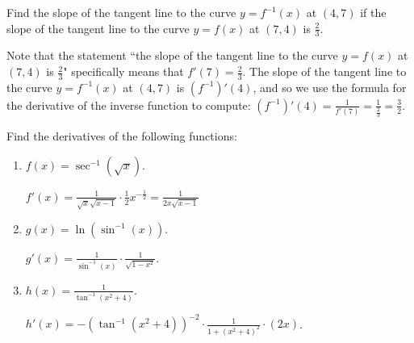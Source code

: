 \documentclass[nooutcomes,handout]{ximera}
\begin{document}
\begin{problem}

  Find the slope of the tangent line to the curve $y = f^{-1}(x)$ at $(4,7)$ if the slope of the tangent line to the curve $y=f(x)$ at $(7,4)$ is $\frac{2}{3}$.
  \begin{freeResponse}
    Note that the statement ``the slope of the tangent line to the curve $y=f(x)$ at $(7,4)$ is $\frac{2}{3}$" specifically means that $f'(7) = \frac{2}{3}$.
    The slope of the tangent line to the curve $y = f^{-1}(x)$ at $(4,7)$ is $(f^{-1})'(4)$, and so we use the formula for the derivative of the inverse function to compute: $(f^{-1})'(4) = \frac{1}{f'(7)} = \frac{1}{\frac{2}{3}} = \frac{3}{2}$.
  \end{freeResponse}
\end{problem}

\begin{problem}
Find the derivatives of the following functions:
	\begin{enumerate}
	
	\item  $f(x) = \sec^{-1} (\sqrt{x})$.
		\begin{freeResponse}
		$f'(x) = \frac{1}{\sqrt{x} \sqrt{x - 1}} \cdot \frac{1}{2} x^{-\frac{1}{2}} = \frac{1}{2x\sqrt{x-1}}$
		\end{freeResponse}
		
		
		
	\item  $g(x) = \ln (\sin^{-1}(x))$.
		\begin{freeResponse}
		$g'(x) = \frac{1}{\sin^{-1}(x)} \cdot \frac{1}{\sqrt{1-x^2}}$.
		\end{freeResponse}
		
		
		
	\item  $h(x) = \frac{1}{\tan^{-1}(x^2 + 4)}$.  
		\begin{freeResponse}
		$h'(x) = - \left( \tan^{-1}(x^2 + 4) \right)^{-2} \cdot \frac{1}{1 + (x^2 + 4)^2} \cdot (2x)$.
		\end{freeResponse}
		
		
		
	\end{enumerate}
		
		
\end{problem}
\end{document}
